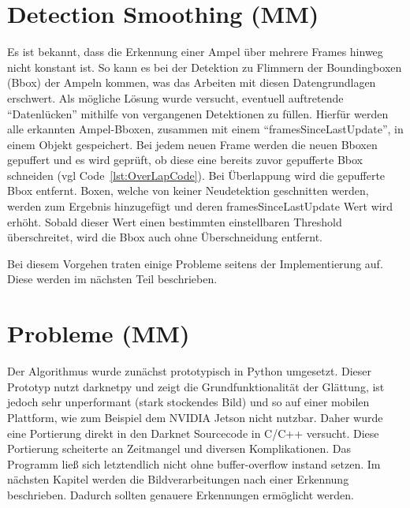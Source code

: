 \documentclass[a4paper,oneside,12pt]{report}
\begin{document}
\begin{onehalfspace}
		\section{Detection Smoothing (MM)}
		Es ist bekannt, dass die Erkennung einer Ampel über mehrere Frames hinweg nicht konstant ist. So kann es bei der Detektion zu Flimmern der Boundingboxen (Bbox) der Ampeln kommen, was das Arbeiten mit diesen Datengrundlagen erschwert.\newline
		Als mögliche Lösung wurde versucht, eventuell auftretende "`Datenlücken"' mithilfe von vergangenen Detektionen zu füllen. Hierfür werden alle erkannten Ampel-Bboxen, zusammen mit einem "`framesSinceLastUpdate"', in einem Objekt gespeichert. Bei jedem neuen Frame werden die neuen Bboxen gepuffert und es wird geprüft, ob diese eine bereits zuvor gepufferte Bbox schneiden (vgl Code~\ref{lst:OverLapCode}). Bei Überlappung wird die gepufferte Bbox entfernt. Boxen, welche von keiner Neudetektion geschnitten werden, werden zum Ergebnis hinzugefügt und deren framesSinceLastUpdate Wert wird erhöht. Sobald dieser Wert einen bestimmten einstellbaren Threshold überschreitet, wird die Bbox auch ohne Überschneidung entfernt.
		
		Bei diesem Vorgehen traten einige Probleme seitens der Implementierung auf. Diese werden im nächsten Teil beschrieben.
		\section{Probleme (MM)}
		Der Algorithmus wurde zunächst prototypisch in Python umgesetzt. Dieser Prototyp nutzt darknetpy und zeigt die Grundfunktionalität der Glättung, ist jedoch sehr unperformant (stark stockendes Bild) und so auf einer mobilen Plattform, wie zum Beispiel dem NVIDIA Jetson nicht nutzbar. Daher wurde eine Portierung direkt in den Darknet Sourcecode in C/C++ versucht. Diese Portierung scheiterte an Zeitmangel und diversen Komplikationen. Das Programm ließ sich letztendlich nicht ohne buffer-overflow instand setzen. Im nächsten Kapitel werden die Bildverarbeitungen nach einer Erkennung beschrieben. Dadurch sollten genauere Erkennungen ermöglicht werden.
	\end{onehalfspace}
\end{document}
